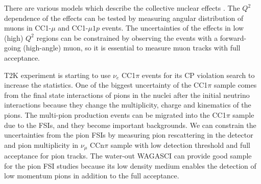 There are various models which describe the collective nuclear effects \cite{collective_nuclear_effect}.
The $Q^{2}$ dependence of the effects can be tested by measuring angular distribution of muons in CC1-$\mu$ and CC1-$\mu 1p$ events.
The uncertainties of the effects in low (high) $Q^{2}$ regions can be constrained by observing the events with a forward-going (high-angle) muon, so it is essential to measure muon tracks with full acceptance.


T2K experiment is starting to use $\nu_{e}$ CC1$\pi$ events for its CP violation search to increase the statistics.
One of the biggest uncertainty of the CC1$\pi$ sample comes from the final state interactions of pions in the nuclei after the initial neutrino interactions because they change the multiplicity, charge and kinematics of the pions.
The multi-pion production events can be migrated into the CC1$\pi$ sample due to the FSIs, and they become important backgrounds.
We can constrain the uncertainties from the pion FSIs by measuring pion rescattering in the detector and pion multiplicity in $\nu_{\mu}$ CCn$\pi$ sample with low detection threshold and full acceptance for pion tracks.
The water-out WAGASCI can provide good sample for the pion FSI studies because its low density medium enables the detection of low momentum pions in addition to the full acceptance.

